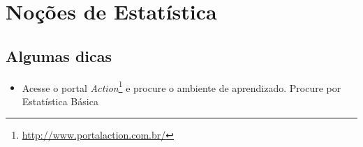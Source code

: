 \chapter{Noções de Estatística}
\section{Algumas dicas}
\begin{itemize}
    \item Acesse o portal \textit{Action}\footnote{\url{http://www.portalaction.com.br/}} e procure o ambiente de aprendizado. Procure por Estatística Básica
\end{itemize}